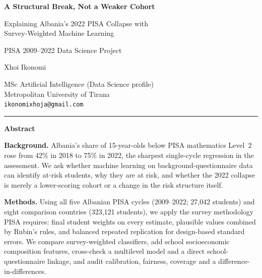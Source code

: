 \documentclass[11pt,a4paper]{article}
\newcommand{\athigh}[1]{\textcolor{riskred}{#1}}
\newcommand{\atlow}[1]{\textcolor{okgreen}{#1}}
\begin{document}
\begin{titlepage}
\centering
\vspace*{0.9cm}

{\LARGE\bfseries A Structural Break, Not a Weaker Cohort\par}
\vspace{0.5cm}
{\large Explaining Albania's 2022 PISA Collapse with\\Survey-Weighted Machine Learning\par}
\vspace{0.8cm}
{\large PISA 2009--2022 Data Science Project\par}
\vspace{0.9cm}

{\large Xhoi Ikonomi\par}
\vspace{0.35cm}
{MSc Artificial Intelligence (Data Science profile)\\[2pt]
Metropolitan University of Tirana\\[2pt]
\texttt{ikonomixhoja@gmail.com}\par}

\vspace{0.8cm}
\rule{0.42\linewidth}{0.4pt}\par
\vspace{0.4cm}
{\bfseries Abstract\par}
\vspace{0.25cm}
\begin{minipage}{0.86\linewidth}
\small
\textbf{Background.}
Albania's share of 15-year-olds below PISA mathematics Level~2 rose from
\atlow{42\%} in 2018 to \athigh{75\%} in 2022, the sharpest single-cycle regression in
the assessment. We ask whether machine learning on background-questionnaire data can
identify at-risk students, why they are at risk, and whether the 2022 collapse is merely
a lower-scoring cohort or a change in the risk structure itself.

\textbf{Methods.}
Using all five Albanian PISA cycles (2009--2022; 27{,}042 students) and eight comparison
countries (323{,}121 students), we apply the survey methodology PISA requires: final
student weights on every estimate, plausible values combined by Rubin's rules, and
balanced repeated replication for design-based standard errors. We compare
survey-weighted classifiers, add school socioeconomic composition features, cross-check a
multilevel model and a direct school-questionnaire linkage, and audit calibration,
fairness, coverage and a difference-in-differences.


\end{minipage}
\end{titlepage}
\end{document}

